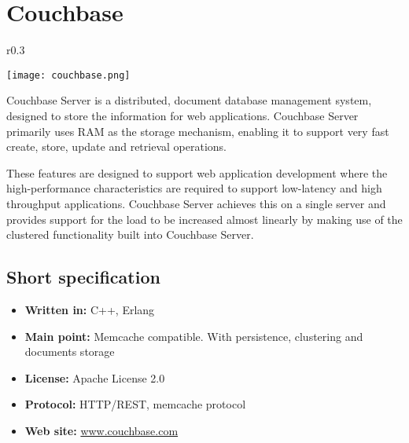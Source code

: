 \chapter{Couchbase}

\begin{wrapfigure}{r}{0.3\textwidth}
  \vspace{-40pt}
  \begin{center}
    \texttt{[image: couchbase.png]}
  \end{center}
  \vspace{50pt}
\end{wrapfigure}
Couchbase Server is a distributed, document database management system, designed to store the information for web applications. Couchbase Server primarily uses RAM as the storage mechanism, enabling it to support very fast create, store, update and retrieval operations.

These features are designed to support web application development where the high-performance characteristics are required to support low-latency and high throughput applications. Couchbase Server achieves this on a single server and provides support for the load to be increased almost linearly by making use of the clustered functionality built into Couchbase Server.

\section{Short specification}

\begin{itemize}
  \item \textbf{Written in:} C++, Erlang
  \item \textbf{Main point:} Memcache compatible. With persistence, clustering and documents storage
  \item \textbf{License:} Apache License 2.0
  \item \textbf{Protocol:} HTTP/REST, memcache protocol
  \item \textbf{Web site:} \href{http://www.couchbase.com/}{www.couchbase.com}
\end{itemize}

